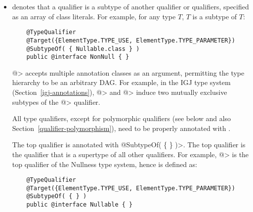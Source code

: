 \begin{itemize}

\item {} denotes that a qualifier is a subtype of
  another qualifier or qualifiers, specified as an array of class
  literals.  For example, for any type $T$,
   $T$ is a subtype of  $T$:

  \begin{Verbatim}
    @TypeQualifier
    @Target({ElementType.TYPE_USE, ElementType.TYPE_PARAMETER})
    @SubtypeOf( { Nullable.class } )
    public @interface NonNull { }
  \end{Verbatim}



  \<@> accepts multiple annotation classes as an argument,
  permitting the type hierarchy to be an arbitrary DAG\@.  For example,
  in the IGJ type system (Section~\ref{igj-annotations}), \<@>
  and \<@> induce two mutually exclusive subtypes of the
  \<@> qualifier.


  All type qualifiers, except for polymorphic qualifiers (see below and
  also Section~\ref{qualifier-polymorphism}), need to be
  properly annotated with .

  The top qualifier is annotated with
  \<@SubtypeOf( \{ \} )>.  The top qualifier is the qualifier that is
  a supertype of all other qualifiers.  For example, \<@>
  is the top qualifier of the Nullness type system, hence is defined as:

  \begin{Verbatim}
    @TypeQualifier
    @Target({ElementType.TYPE_USE, ElementType.TYPE_PARAMETER})
    @SubtypeOf( { } )
    public @interface Nullable { }
  \end{Verbatim}


\end{itemize}
